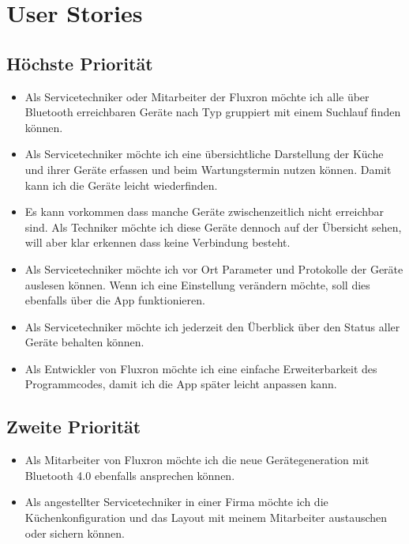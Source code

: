
\section{User Stories}
\label{sec:User Stories}

\subsection{Höchste Priorität}
\label{subsec:Höchste Priorität}

\begin{itemize}
\item Als Servicetechniker oder Mitarbeiter der Fluxron möchte ich alle über Bluetooth erreichbaren Geräte nach Typ gruppiert mit einem Suchlauf finden können.
\item Als Servicetechniker möchte ich eine übersichtliche Darstellung der Küche und ihrer Geräte erfassen und beim Wartungstermin nutzen können. Damit kann ich die Geräte leicht wiederfinden.
\item Es kann vorkommen dass manche Geräte zwischenzeitlich nicht erreichbar sind. Als Techniker möchte ich diese Geräte dennoch auf der Übersicht sehen, will aber klar erkennen dass keine Verbindung besteht.
\item Als Servicetechniker möchte ich vor Ort Parameter und Protokolle der Geräte auslesen können. Wenn ich eine Einstellung verändern möchte, soll dies ebenfalls über die App funktionieren.
\item Als Servicetechniker möchte ich jederzeit den Überblick über den Status aller Geräte behalten können.
\item Als Entwickler von Fluxron möchte ich eine einfache Erweiterbarkeit des Programmcodes, damit ich die App später leicht anpassen kann.
\end{itemize}

\subsection{Zweite Priorität}
\label{subsec:Zweite Priorität}

\begin{itemize}
\item Als Mitarbeiter von Fluxron möchte ich die neue Gerätegeneration mit Bluetooth 4.0 ebenfalls ansprechen können.
\item Als angestellter Servicetechniker in einer Firma möchte ich die Küchenkonfiguration und das Layout mit meinem Mitarbeiter austauschen oder sichern können.
\end{itemize}

